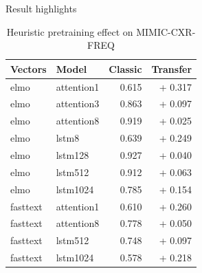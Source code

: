 \documentclass[pdf]{beamer}
\newcommand{\?}{\ensuremath{^\texttt{\bf [CITATION~NEEDED]}}}
\begin{document}
\begin{frame}{Result highlights}

\begin{table}
\caption{Heuristic pretraining effect on MIMIC-CXR-FREQ}
\label{pretraining-effect}
\begin{tabular}{llrr}
\toprule
Vectors &       Model        &  Classic &  Transfer \\
\midrule
                   elmo &        attention1 &    0.615 &    + 0.317 \\
                   elmo &        attention3 &    0.863 &    + 0.097 \\
                   elmo &        attention8 &    0.919 &    + 0.025 \\
                   elmo &             lstm8 &    0.639 &    + 0.249 \\
                   elmo &           lstm128 &    0.927 &    + 0.040 \\
                   elmo &           lstm512 &    0.912 &    + 0.063 \\
                   elmo &          lstm1024 &    0.785 &    + 0.154 \\
               fasttext &        attention1 &    0.610 &    + 0.260 \\
               fasttext &        attention8 &    0.778 &    + 0.050 \\
               fasttext &           lstm512 &    0.748 &    + 0.097 \\
               fasttext &          lstm1024 &    0.578 &    + 0.218 \\
\bottomrule
\end{tabular}
\end{table}

\end{frame}
\end{document}
